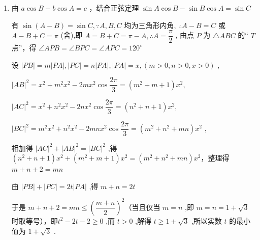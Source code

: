 \begin{enumerate}
\begin{jieda}
\begin{enumerate}
\begin{dingautolist}{172}
                    由 “ $T$ 点” 定义知: $\angle {APB} = \angle {BPC} = \angle {APC} = {120}^{ \circ  }$ ,

                    设 $\left| \vv{PA}\right|  = x,\left| \vv{PB}\right|  = y,\left| \vv{PC}\right|  = z$ ,由 ${S}_{\bigtriangleup {APB}} + {S}_{\bigtriangleup {BPC}} + {S}_{\bigtriangleup {APC}} = {S}_{\bigtriangleup {ABC}}$ 得

                    $\dfrac{1}{2}{xy} \cdot  \dfrac{\sqrt{3}}{2} + \dfrac{1}{2}{yz} \cdot  \dfrac{\sqrt{3}}{2} + \dfrac{1}{2}{xz} \cdot  \dfrac{\sqrt{3}}{2} = \dfrac{1}{2} \times  4 \times  \dfrac{\sqrt{3}}{2}$ ,整理得 ${xy} + {yz} + {xz} = 4$ ,

                    所以 $\vv{PA} \cdot  \vv{PB} + \vv{PB} \cdot  \vv{PC} + \vv{PA} \cdot  \vv{PC} = {xy} \cdot  \left( {-\dfrac{1}{2}}\right)  + {yz} \cdot  \left( {-\dfrac{1}{2}}\right)  + {xz} \cdot  \left( {-\dfrac{1}{2}}\right)  =  - \dfrac{1}{2} \times  4 =  - 2$.

            \end{dingautolist}
            \item 由 $a\cos B - b\cos A = c$ ，结合正弦定理 $\sin A\cos B - \sin B\cos A = \sin C$

            有 $\sin \left( {A - B}\right)  = \sin C,\because A,B,C$ 均为三角形内角, $\therefore A - B = C$ 或 $A - B + C = \pi$ (舍),即 $A = B + C = \pi  - A,\therefore A = \dfrac{\pi }{2}$ , 由点 $P$ 为 $\bigtriangleup  {ABC}$ 的“ $T$ 点”，得 $\angle {APB} = \angle {BPC} = \angle {APC} = {120}^{ \circ  }$

            设 $\left| {PB}\right|  = m\left| {PA}\right| ,\left| {PC}\right|  = n\left| {PA}\right| ,\left| {PA}\right|  = x,\left( {m > 0,n > 0,x > 0}\right)$ ,

            ${\left| AB\right| }^{2} = {x}^{2} + {m}^{2}{x}^{2} - {2m}{x}^{2}\cos \dfrac{2\pi }{3} = \left( {{m}^{2} + m + 1}\right) {x}^{2},$

            ${\left| AC\right| }^{2} = {x}^{2} + {n}^{2}{x}^{2} - {2n}{x}^{2}\cos \dfrac{2\pi }{3} = \left( {{n}^{2} + n + 1}\right) {x}^{2},$

            ${\left| BC\right| }^{2} = {m}^{2}{x}^{2} + {n}^{2}{x}^{2} - {2mn}{x}^{2}\cos \dfrac{2\pi }{3} = \left( {{m}^{2} + {n}^{2} + {mn}}\right) {x}^{2}$ ,

            相加得 ${\left| AC\right| }^{2} + {\left| AB\right| }^{2} = {\left| BC\right| }^{2}$ ,得 $\left( {{n}^{2} + n + 1}\right) {x}^{2} + \left( {{m}^{2} + m + 1}\right) {x}^{2} = \left( {{m}^{2} + {n}^{2} + {mn}}\right) {x}^{2}$，整理得 $m + n + 2 = {mn}$ 
            
            由 $\left| {PB}\right|  + \left| {PC}\right|  = {2t}\left| {PA}\right|$ ,得 $m + n = {2t}$

            于是 $m + n + 2 = {mn} \leq  {\left( \dfrac{m + n}{2}\right) }^{2}$（当且仅当 $m = n$ ,即 $m = n = 1 + \sqrt{3}$ 时取等号），即${t}^{2} - {2t} - 2 \geq  0$ ,而 $t > 0$ ,解得 $t \geq  1 + \sqrt{3}$ ,所以实数 $t$ 的最小值为 $1 + \sqrt{3}$ .
        \end{enumerate}
    \end{jieda}
\end{enumerate}